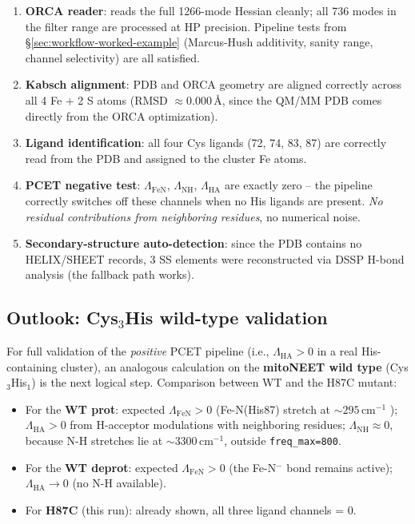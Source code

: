 \documentclass[11pt,a4paper,twoside]{article}
\providecommand{\angstrom}{\text{\AA}}    %
\theoremstyle{remark}
\begin{document}
\begin{enumerate}
  \item \textbf{ORCA reader}: reads the full 1266-mode Hessian
        cleanly; all 736 modes in the filter range are processed
        at HP precision. Pipeline tests from
        \S\ref{sec:workflow-worked-example} (Marcus-Hush
        additivity, sanity range, channel selectivity) are all
        satisfied.
  \item \textbf{Kabsch alignment}: PDB and ORCA geometry are
        aligned correctly across all 4 Fe + 2 S atoms (RMSD
        $\approx 0.000$\,$\angstrom$, since the QM/MM PDB comes
        directly from the ORCA optimization).
  \item \textbf{Ligand identification}: all four Cys ligands
        (72, 74, 83, 87) are correctly read from the PDB and
        assigned to the cluster Fe atoms.
  \item \textbf{PCET negative test}: $\Lambda_\text{FeN}$,
        $\Lambda_\text{NH}$, $\Lambda_\text{HA}$ are exactly zero
        -- the pipeline correctly switches off these channels
        when no His ligands are present. \emph{No residual
        contributions from neighboring residues}, no numerical
        noise.
  \item \textbf{Secondary-structure auto-detection}: since the
        PDB contains no HELIX/SHEET records, 3 SS elements were
        reconstructed via DSSP H-bond analysis (the fallback
        path works).
\end{enumerate}

\subsection{Outlook: Cys$_3$His wild-type validation}
\label{sec:val-cys3his-wt}

For full validation of the \emph{positive} PCET pipeline (i.e.,
$\Lambda_\text{HA} > 0$ in a real His-containing cluster), an
analogous calculation on the \textbf{mitoNEET wild type}
(Cys$_3$His$_1$) is the next logical step. Comparison between WT
and the H87C mutant:

\begin{itemize}\setlength{\itemsep}{0pt}
  \item For the \textbf{WT prot}: expected $\Lambda_\text{FeN} > 0$
        (Fe-N(His87) stretch at $\sim 295$\,cm$^{-1}$
        \cite{Gee2021}); $\Lambda_\text{HA} > 0$ from H-acceptor
        modulations with neighboring residues;
        $\Lambda_\text{NH} \approx 0$, because N-H stretches lie
        at $\sim 3300$\,cm$^{-1}$, outside
        \texttt{freq\_max=800}.
  \item For the \textbf{WT deprot}: expected
        $\Lambda_\text{FeN} > 0$ (the Fe-N$^-$ bond remains
        active); $\Lambda_\text{HA} \to 0$ (no N-H available).
  \item For \textbf{H87C} (this run): already shown, all three
        ligand channels = 0.
\end{itemize}
\end{document}
